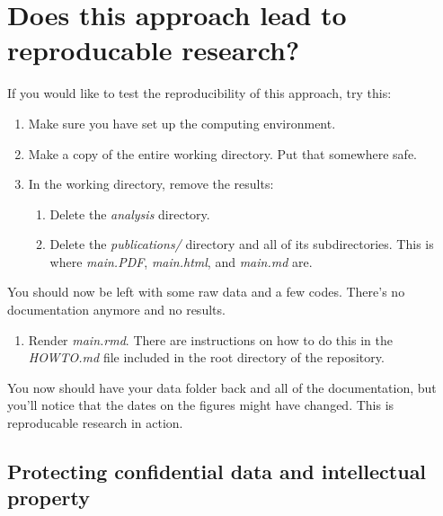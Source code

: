 \documentclass[11pt,]{article}
\providecommand{\tightlist}{%
  \setlength{\itemsep}{0pt}\setlength{\parskip}{0pt}}
\begin{document}
\hypertarget{does-this-approach-lead-to-reproducable-research}{%
\section{Does this approach lead to reproducable research?}\label{does-this-approach-lead-to-reproducable-research}}

If you would like to test the reproducibility of this approach, try this:

\begin{enumerate}
\def\labelenumi{\arabic{enumi}.}
\tightlist
\item
  Make sure you have set up the computing environment.
\item
  Make a copy of the entire working directory. Put that somewhere safe.
\item
  In the working directory, remove the results:

  \begin{enumerate}
  \def\labelenumii{\arabic{enumii}.}
  \tightlist
  \item
    Delete the \emph{analysis} directory.
  \item
    Delete the \emph{publications/} directory and all of its subdirectories. This is where \emph{main.PDF}, \emph{main.html}, and \emph{main.md} are.
  \end{enumerate}
\end{enumerate}

You should now be left with some raw data and a few codes. There's no documentation anymore and no results.

\begin{enumerate}
\def\labelenumi{\arabic{enumi}.}
\setcounter{enumi}{4}
\tightlist
\item
  Render \emph{main.rmd}. There are instructions on how to do this in the \emph{HOWTO.md} file included in the root directory of the repository.
\end{enumerate}

You now should have your data folder back and all of the documentation, but you'll notice that the dates on the figures might have changed. This is reproducable research in action.

\hypertarget{protecting-confidential-data-and-intellectual-property}{%
\subsection{Protecting confidential data and intellectual property}\label{protecting-confidential-data-and-intellectual-property}}
\end{document}

